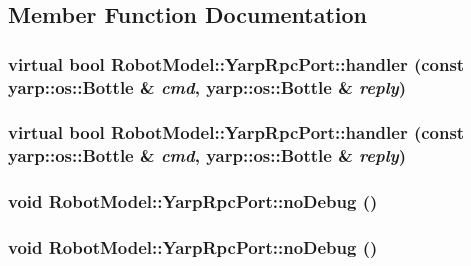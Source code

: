 \subsection{Member Function Documentation}
\hypertarget{class_robot_model_1_1_yarp_rpc_port_a156879aeb8b6641c0f63a6633af8c568}{
\subsubsection[{handler}]{\setlength{\rightskip}{0pt plus 5cm}virtual bool RobotModel::YarpRpcPort::handler (const yarp::os::Bottle \& {\em cmd}, \/  yarp::os::Bottle \& {\em reply})}}
\label{class_robot_model_1_1_yarp_rpc_port_a156879aeb8b6641c0f63a6633af8c568}
\hypertarget{class_robot_model_1_1_yarp_rpc_port_a156879aeb8b6641c0f63a6633af8c568}{
\subsubsection[{handler}]{\setlength{\rightskip}{0pt plus 5cm}virtual bool RobotModel::YarpRpcPort::handler (const yarp::os::Bottle \& {\em cmd}, \/  yarp::os::Bottle \& {\em reply})}}
\label{class_robot_model_1_1_yarp_rpc_port_a156879aeb8b6641c0f63a6633af8c568}
\hypertarget{class_robot_model_1_1_yarp_rpc_port_a87e299eb43783a25cd71def0e50eb9dc}{
\subsubsection[{noDebug}]{\setlength{\rightskip}{0pt plus 5cm}void RobotModel::YarpRpcPort::noDebug ()}}
\label{class_robot_model_1_1_yarp_rpc_port_a87e299eb43783a25cd71def0e50eb9dc}
\hypertarget{class_robot_model_1_1_yarp_rpc_port_a87e299eb43783a25cd71def0e50eb9dc}{
\subsubsection[{noDebug}]{\setlength{\rightskip}{0pt plus 5cm}void RobotModel::YarpRpcPort::noDebug ()}}
